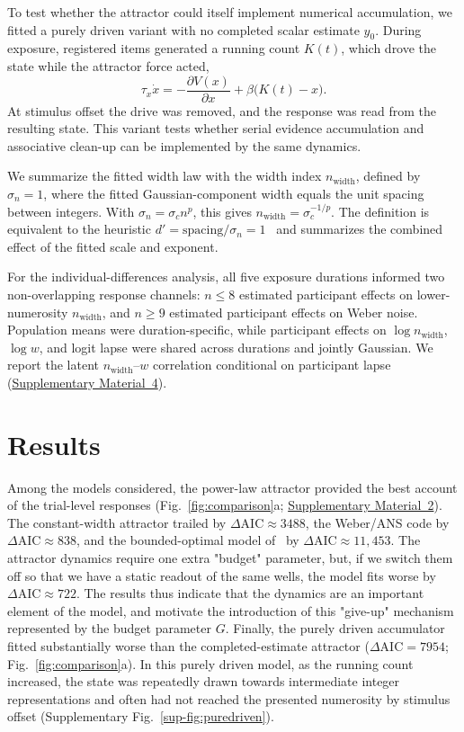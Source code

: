 \documentclass[Afour,sageh,times]{sagej}
\begin{document}
To test whether the attractor could itself implement numerical accumulation, we fitted a purely driven variant with no completed scalar estimate $y_0$. During exposure, registered items generated a running count $K(t)$, which drove the state while the attractor force acted,
%
\[\tau_x \dot{x}=-\frac{\partial V(x)}{\partial x}+\beta\bigl(K(t)-x\bigr).\]
%
At stimulus offset the drive was removed, and the response was read from the resulting state. This variant tests whether serial evidence accumulation and associative clean-up can be implemented by the same dynamics.

We summarize the fitted width law with the width index $n_{\mathrm{width}}$, defined by $\sigma_n=1$, where the fitted Gaussian-component width equals the unit spacing between integers. With $\sigma_n=\sigma_c n^p$, this gives $n_{\mathrm{width}}=\sigma_c^{-1/p}$. The definition is equivalent to the heuristic $d'=\mathrm{spacing}/\sigma_n=1$~\citep{macmillan_detection_2004} and summarizes the combined effect of the fitted scale and exponent.

For the individual-differences analysis, all five exposure durations informed two non-overlapping response channels: $n\leq8$ estimated participant effects on lower-numerosity $n_{\mathrm{width}}$, and $n\geq9$ estimated participant effects on Weber noise. Population means were duration-specific, while participant effects on $\log n_{\mathrm{width}}$, $\log w$, and logit lapse were shared across durations and jointly Gaussian. We report the latent $n_{\mathrm{width}}$--$w$ correlation conditional on participant lapse (\hyperref[sup-sm:predictions]{Supplementary Material~4}).

\section{Results}

Among the models considered, the power-law attractor provided the best account of the trial-level responses (Fig.~\ref{fig:comparison}a; \hyperref[sup-sm:comparison]{Supplementary Material~2}). The constant-width attractor trailed by $\Delta\mathrm{AIC}\approx3488$, the Weber/ANS code by $\Delta\mathrm{AIC}\approx838$, and the bounded-optimal model of~\citet{cheyette_unified_2020} by $\Delta\mathrm{AIC}\approx11{,}453$. The attractor dynamics require one extra "budget" parameter, but, if we switch them off so that we have a static readout of the same wells, the model fits worse by $\Delta\mathrm{AIC} \approx 722$. The results thus indicate that the dynamics are an important element of the model, and motivate the introduction of this "give-up" mechanism represented by the budget parameter $G$. Finally, the purely driven accumulator fitted substantially worse than the completed-estimate attractor ($\Delta\mathrm{AIC}=7954$; Fig.~\ref{fig:comparison}a). In this purely driven model, as the running count increased, the state was repeatedly drawn towards intermediate integer representations and often had not reached the presented numerosity by stimulus offset (Supplementary Fig.~\ref{sup-fig:puredriven}).
\end{document}
